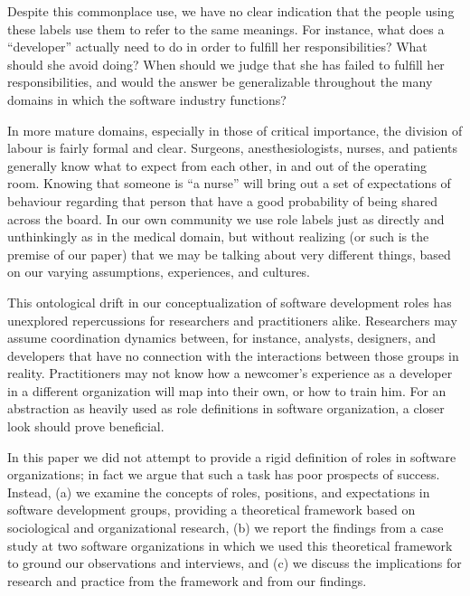 \documentclass[10pt, conference, compsocconf]{IEEEtran}
\begin{document}
Despite this commonplace use, we have no clear indication that the people using these labels use them to refer to the same meanings. For instance, what does a ``developer'' actually need to do in order to fulfill her responsibilities? What should she avoid doing? When should we judge that she has failed to fulfill her responsibilities, and would the answer be generalizable throughout the many domains in which the software industry functions?

In more mature domains, especially in those of critical importance, the division of labour is fairly formal and clear. Surgeons, anesthesiologists, nurses, and patients generally know what to expect from each other, in and out of the operating room. Knowing that someone is ``a nurse'' will bring out a set of expectations of behaviour regarding that person that have a good probability of being shared across the board. In our own community we use role labels just as directly and unthinkingly as in the medical domain, but without realizing (or such is the premise of our paper) that we may be talking about very different things, based on our varying assumptions, experiences, and cultures.

This ontological drift \cite{Robinson1991} in our conceptualization of software development roles has unexplored repercussions for researchers and practitioners alike. Researchers may assume coordination dynamics between, for instance, analysts, designers, and developers that have no connection with the interactions between those groups in reality. Practitioners may not know how a newcomer's experience as a developer in a different organization will map into their own, or how to train him. For an abstraction as heavily used as role definitions in software organization, a closer look should prove beneficial.

In this paper we did not attempt to provide a rigid definition of roles in software organizations; in fact we argue that such a task has poor prospects of success. Instead, (a) we examine the concepts of roles, positions, and expectations in software development groups, providing a theoretical framework based on sociological and organizational research, (b) we report the findings from a case study at two software organizations in which we used this theoretical framework to ground our observations and interviews, and (c) we discuss the implications for research and practice from the framework and from our findings.


\end{document}
